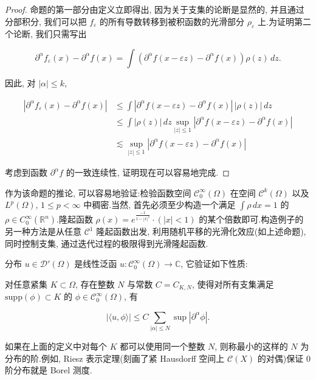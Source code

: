 \begin{proof}
命题的第一部分由定义立即得出, 因为关于支集的论断是显然的, 并且通过分部积分, 我们可以把 $f_{\varepsilon}$ 的所有导数转移到被积函数的光滑部分 $\rho_{\varepsilon}$ 上.为证明第二个论断, 我们只需写出

\[
\partial^{\alpha}f_{\varepsilon}(x) - \partial^{\alpha}f(x) = \int\left(\partial^{\alpha}f(x-\varepsilon z) - \partial^{\alpha}f(x)\right)\rho(z)\, dz.
\]

因此, 对 $|\alpha|\leq k$,

\[
\begin{aligned}
|\partial^{\alpha}f_{\varepsilon}(x) - \partial^{\alpha}f(x)| &\leq \int|\partial^{\alpha}f(x-\varepsilon z) - \partial^{\alpha}f(x)|\, |\rho(z)|\, dz \\
&\leq \int|\rho(z)|\, dz\sup_{|z|\leq 1}|\partial^{\alpha}f(x-\varepsilon z) - \partial^{\alpha}f(x)| \\
&\lesssim \sup_{|z|\leq 1}|\partial^{\alpha}f(x-\varepsilon z) - \partial^{\alpha}f(x)|
\end{aligned}
\]

考虑到函数 $\partial^{\alpha}f$ 的一致连续性, 证明现在可以容易地完成.
\end{proof}

作为该命题的推论, 可以容易地验证:检验函数空间 $\mathcal{C}_0^{\infty}(\Omega)$ 在空间 $\mathcal{C}^k(\Omega)$ 以及 $L^p(\Omega)$, $1\leq p<\infty$ 中稠密.当然, 首先必须至少构造一个满足 $\int\rho\, dx = 1$ 的 $\rho\in C_0^{\infty}(\mathbb{R}^n)$.隆起函数 $\rho(x) = e^{\frac{-1}{1-|x|^2}}\cdot(|x|<1)$ 的某个倍数即可.构造例子的另一种方法是从任意 $\mathcal{C}^1$ 隆起函数出发, 利用随机平移的光滑化效应(如上述命题), 同时控制支集, 通过迭代过程的极限得到光滑隆起函数.

\begin{definition}\label{def:c3-2.2}
分布 $u\in\mathcal{D}'(\Omega)$ 是线性泛函 $u : \mathcal{C}_0^{\infty}(\Omega)\to\mathbb{C}$, 它验证如下性质:

对任意紧集 $K\subset\Omega$, 存在整数 $N$ 与常数 $C = C_{K, N}$, 使得对所有支集满足 $\mathrm{supp}(\phi)\subset K$ 的 $\phi\in\mathcal{C}_0^{\infty}(\Omega)$, 有

\[
|\langle u, \phi\rangle| \leq C\sum_{|\alpha|\leq N}\sup|\partial^{\alpha}\phi|.
\]

如果在上面的定义中对每个 $K$ 都可以使用同一个整数 $N$, 则称最小的这样的 $N$ 为分布的阶.例如, Riesz 表示定理(刻画了紧 Hausdorff 空间上 $\mathcal{C}(X)$ 的对偶)保证 0 阶分布就是 Borel 测度.
\end{definition}


